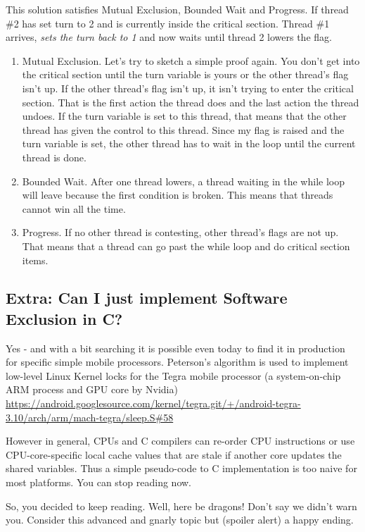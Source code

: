 This solution satisfies Mutual Exclusion, Bounded Wait and Progress.
If thread \#2 has set turn to 2 and is currently inside the critical section.
Thread \#1 arrives, \emph{sets the turn back to 1} and now waits until thread 2 lowers the flag.

\begin{enumerate}
\item Mutual Exclusion. Let's try to sketch a simple proof again.
  You don't get into the critical section until the turn variable is yours or the other thread's flag isn't up.
  If the other thread's flag isn't up, it isn't trying to enter the critical section.
  That is the first action the thread does and the last action the thread undoes.
  If the turn variable is set to this thread, that means that the other thread has given the control to this thread.
  Since my flag is raised and the turn variable is set, the other thread has to wait in the loop until the current thread is done.
\item Bounded Wait. After one thread lowers, a thread waiting in the while loop will leave because the first condition is broken. This means that threads cannot win all the time.
\item Progress. If no other thread is contesting, other thread's flags are not up. That means that a thread can go past the while loop and do critical section items.
\end{enumerate}

\subsection{Extra: Can I just implement Software Exclusion in C?}

Yes - and with a bit searching it is possible even today to find it in production for specific simple mobile processors.
Peterson's algorithm is used to implement low-level Linux Kernel locks for the Tegra mobile processor (a system-on-chip ARM process and GPU core by Nvidia) \href{Link to Lock Source}{https://android.googlesource.com/kernel/tegra.git/+/android-tegra-3.10/arch/arm/mach-tegra/sleep.S\#58}

However in general, CPUs and C compilers can re-order CPU instructions or use CPU-core-specific local cache values that are stale if another core updates the shared variables.
Thus a simple pseudo-code to C implementation is too naive for most platforms.
You can stop reading now.

So, you decided to keep reading.
Well, here be dragons!
Don't say we didn't warn you.
Consider this advanced and gnarly topic but (spoiler alert) a happy ending.

